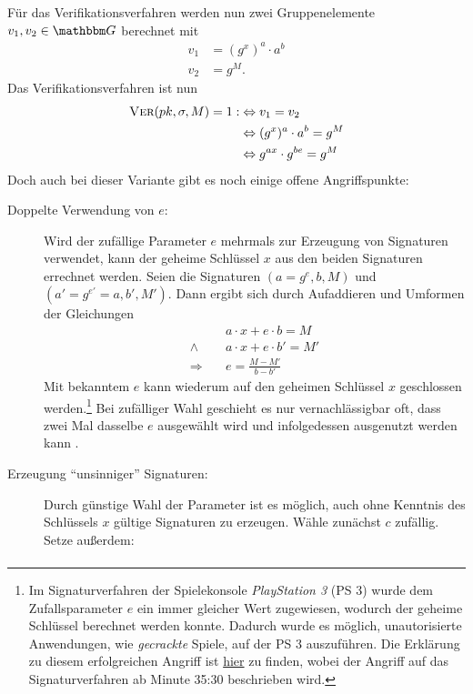 Für das Verifikationsverfahren werden nun zwei Gruppenelemente $v_1,
v_2 \in \G$ berechnet mit
\begin{align*}
  v_1 &= (g^x)^a \cdot a^b\\
  v_2 &= g^M.
\end{align*}
Das Verifikationsverfahren ist nun
\begin{align*}
\textsc{Ver}(pk,\sigma,M) = 1 : & \Leftrightarrow v_1 = v_2 \\
 &\Leftrightarrow (g^x)^a \cdot a^b = g^M \\
 &\Leftrightarrow  g^{ax} \cdot g^{be} = g^M
\end{align*}
Doch auch bei dieser Variante gibt es noch einige offene Angriffspunkte:
\begin{description}
	\item[Doppelte Verwendung von $e$:]
	Wird der zufällige Parameter $e$ mehrmals zur Erzeugung von Signaturen verwendet, kann der geheime Schlüssel $x$ aus den beiden Signaturen errechnet werden. Seien die Signaturen $(a = g^e, b, M)$ und $(a' = g^{e'} = a, b', M')$. Dann ergibt sich durch Aufaddieren und Umformen
	der Gleichungen
	\begin{align*}
	&a \cdot x + e \cdot b = M\\
	\land \quad &a \cdot x + e \cdot b' = M'\\
	\Rightarrow \quad &e = \frac{M - M'}{b - b'}
	\end{align*}
	Mit bekanntem $e$ kann wiederum auf den geheimen Schlüssel $x$
        geschlossen werden.\footnote{Im Signaturverfahren der
          Spielekonsole \textit{PlayStation 3} (PS 3) wurde dem
          Zufallsparameter $e$ ein immer gleicher Wert zugewiesen,
          wodurch der geheime Schlüssel berechnet werden konnte. Dadurch
          wurde es möglich, unautorisierte Anwendungen, wie
          \textit{gecrackte} Spiele, auf der PS 3 auszuführen. Die
          Erklärung zu diesem erfolgreichen Angriff ist
          \href{https://www.youtube.com/watch?v=4loZGYqaZ7I}{hier} zu
          finden, wobei der Angriff auf das Signaturverfahren ab Minute
          35:30 beschrieben wird.} Bei zufälliger Wahl geschieht es nur
        vernachlässigbar oft, dass zwei Mal dasselbe $e$ ausgewählt wird
        und infolgedessen ausgenutzt werden kann .
	\item[Erzeugung "`unsinniger"' Signaturen:]
	Durch günstige Wahl der Parameter ist es möglich, auch ohne Kenntnis des Schlüssels $x$ gültige Signaturen zu erzeugen. Wähle zunächst $c$
	zufällig. Setze außerdem:
	\begin{align*}

\end{align*}
\end{description}
